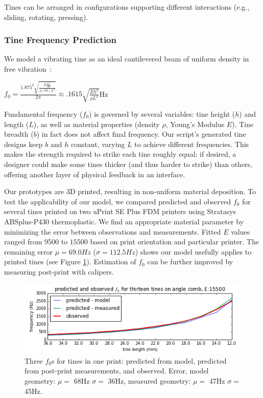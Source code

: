         Tines can be arranged in configurations supporting different interactions (e.g., sliding, rotating, pressing).
        
        \subsubsection{Tine Frequency Prediction}

        We model a vibrating tine as an ideal cantilevered beam of uniform density in free vibration~\cite{meirovitch-analytical}: 

            \begin{center}
             $f_0 = \frac{1.875^2 \sqrt{\frac{E\frac{bh^3}{12}}{\rho (bh)L^4}}}{2\pi} \approx .1615 \sqrt{\frac{Eh^2}{\rho L^4}}$Hz
            \end{center}

            Fundamental frequency ($f_0$) is governed by several variables: tine height ($h$) and length ($L$), as well as material properties (density $\rho$, Young's Modulus $E$). Tine breadth ($b$) in fact does not affect final frequency. Our script's generated tine designs keep $b$ and $h$ constant, varying $L$ to achieve different frequencies. This makes the strength required to strike each tine roughly equal: if desired, a designer could make some tines thicker (and thus harder to strike) than others, offering another layer of physical feedback in an interface.

            Our prototypes are 3D printed, resulting in non-uniform material deposition. To test the applicability of our model, we compared predicted and observed $f_0$ for several tines printed on two uPrint SE Plus FDM printers using Stratasys ABSplus-P430 thermoplastic. We find an appropriate material parameter by minimizing the error between observations and measurements. Fitted $E$ values ranged from $9500$ to $15500$ based on print orientation and particular printer. The remaining error $\mu= 69.0Hz$ ($\sigma= 112.5Hz$) shows our model usefully applies to printed tines (see Figure \ref{fig:lamello-freqsgraph}). Estimation of $f_0$ can be further improved by measuring post-print with calipers.
            
            \begin{figure}[b]
 \centering
    \includegraphics[width=\textwidth]{figures/lamello/meirovitch-small.png}
 \caption{Three $f_0$s for tines in one print: predicted from model, predicted from post-print measurements, and observed. Error, model geometry: $\mu=$ 68Hz $\sigma=$ 36Hz, measured geometry: $\mu=$ 47Hz $\sigma=$ 45Hz.}
 \label{fig:lamello-freqsgraph}
\end{figure}


